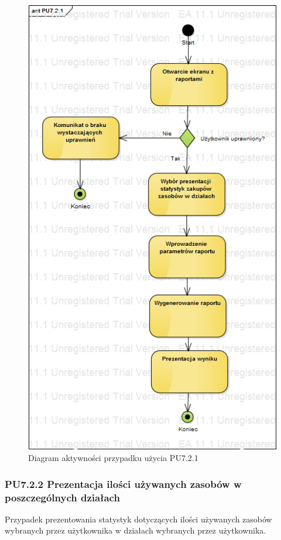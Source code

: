 \begin{figure}[h!]
	\centering
	\includegraphics[scale=0.6]{img/diagrams/activityDiagrams/PU721}
	\caption{Diagram aktywności przypadku użycia PU7.2.1 \label{fig:labelADPU7.2.1}}
\end{figure}

\subsubsection{PU7.2.2 Prezentacja ilości używanych zasobów w poszczególnych działach}
Przypadek prezentowania statystyk dotyczących ilości używanych zasobów wybranych przez użytkownika w działach wybranych przez użytkownika.

